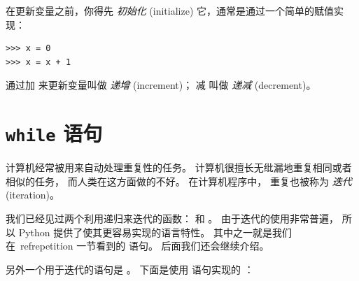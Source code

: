 在更新变量之前，你得先 {\em 初始化} (initialize) 它，通常是通过一个简单的赋值实现：

\begin{lstlisting}
>>> x = 0
>>> x = x + 1
\end{lstlisting}

%
  

通过加  来更新变量叫做 {\em 递增} (increment)； 减  叫做 {\em 递减} (decrement)。
  

\section{{\tt while} 语句}
  
  


计算机经常被用来自动处理重复性的任务。 计算机很擅长无纰漏地重复相同或者相似的任务， 而人类在这方面做的不好。 在计算机程序中， 重复也被称为 {\em 迭代} (iteration)。


我们已经见过两个利用递归来迭代的函数：  和  。 由于迭代的使用非常普遍， 所以 Python 提供了使其更容易实现的语言特性。 其中之一就是我们在~\:ref{repetition} 一节看到的  语句。 后面我们还会继续介绍。



另外一个用于迭代的语句是  。 下面是使用  语句实现的 ：

